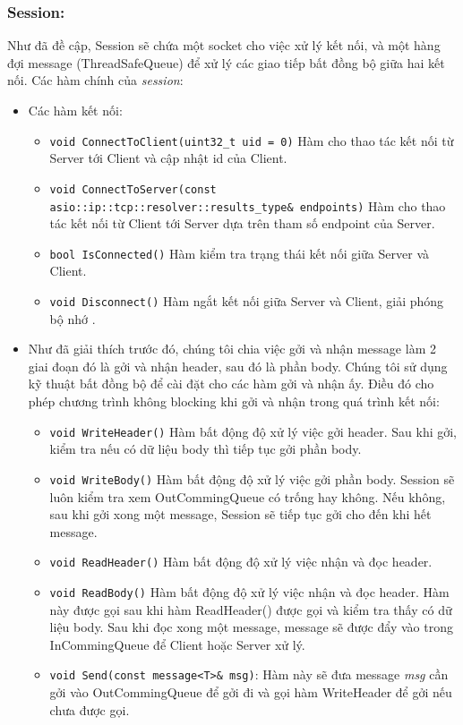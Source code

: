 \subsubsection{Session: }
Như đã đề cập, Session sẽ chứa một socket cho việc xử lý kết nối, và một hàng đợi message (ThreadSafeQueue) để xử lý các giao tiếp bất đồng bộ giữa hai kết nối. 
Các hàm chính của \textit{session}:
\begin{itemize}
	\item Các hàm kết nối:
	\begin{itemize}
		\item[] \lstinline{void ConnectToClient(uint32_t uid = 0)} Hàm cho thao tác kết nối từ Server tới Client và cập nhật id của Client.
		\item[] \lstinline{void ConnectToServer(const asio::ip::tcp::resolver::results_type& endpoints)} Hàm cho thao tác kết nối từ Client tới Server dựa trên tham số endpoint của Server.
		\item[] \lstinline{bool IsConnected()} Hàm kiểm tra trạng thái kết nối giữa Server và Client. 
		\item[] \lstinline{void Disconnect()} Hàm ngắt kết nối giữa Server và Client, giải phóng bộ nhớ . 
	\end{itemize}
	
	\item Như đã giải thích trước đó, chúng tôi chia việc gởi và nhận message làm 2 giai đoạn đó là gởi và nhận header, sau đó là phần body. Chúng tôi sử dụng kỹ thuật bất đồng bộ để cài đặt cho các hàm gởi và nhận ấy. Điều đó cho phép chương trình không blocking khi gởi và nhận trong quá trình kết nối:
	\begin{itemize}
		\item[] \lstinline{void WriteHeader()} Hàm bất động độ xử lý việc gởi header. Sau khi gởi, kiểm tra nếu có dữ liệu body thì tiếp tục gởi phần body.
		\item[] \lstinline{void WriteBody()} Hàm bất động độ xử lý việc gởi phần body. Session sẽ luôn kiểm tra xem OutCommingQueue có trống hay không. Nếu không, sau khi gởi xong một message, Session sẽ tiếp tục gởi cho đến khi hết message.
		\item[] \lstinline{void ReadHeader()} Hàm bất động độ xử lý việc nhận và đọc header. 
		\item[] \lstinline{void ReadBody()} Hàm bất động độ xử lý việc nhận và đọc header. Hàm này được gọi sau khi hàm ReadHeader() được gọi và kiểm tra thấy có dữ liệu body. Sau khi đọc xong một message, message sẽ được đẩy vào trong InCommingQueue để Client hoặc Server xử lý.
		\item[] \lstinline{void Send(const message<T>& msg)}: Hàm này sẽ đưa message \textit{msg} cần gởi vào OutCommingQueue để gởi đi và gọi hàm WriteHeader để gởi nếu chưa được gọi. 
	\end{itemize}
\end{itemize}



